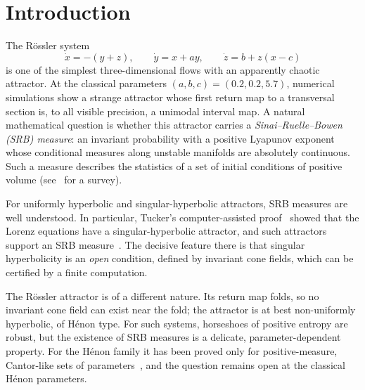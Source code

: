 \documentclass[11pt]{amsart}
\theoremstyle{definition}
\theoremstyle{remark}
\begin{document}
\maketitle

\section{Introduction}

The R\"ossler system~\cite{Rossler76}
\begin{equation}\label{eq:rossler}
\dot x=-(y+z),\qquad \dot y=x+ay,\qquad \dot z=b+z(x-c)
\end{equation}
is one of the simplest three-dimensional flows with an apparently chaotic attractor. At the classical
parameters $(a,b,c)=(0.2,0.2,5.7)$, numerical simulations show a strange attractor whose first return
map to a transversal section is, to all visible precision, a unimodal interval map. A natural
mathematical question is whether this attractor carries a \emph{Sinai--Ruelle--Bowen (SRB) measure}: an
invariant probability with a positive Lyapunov exponent whose conditional measures along unstable
manifolds are absolutely continuous. Such a measure describes the statistics of a set of initial
conditions of positive volume (see~\cite{Young02} for a survey).

For uniformly hyperbolic and singular-hyperbolic attractors, SRB measures are well understood. In
particular, Tucker's computer-assisted proof~\cite{Tucker02} showed that the Lorenz equations have a
singular-hyperbolic attractor, and such attractors support an SRB measure~\cite{APPV09}. The decisive
feature there is that singular hyperbolicity is an \emph{open} condition, defined by invariant cone
fields, which can be certified by a finite computation.

The R\"ossler attractor is of a different nature. Its return map folds, so no invariant cone field can
exist near the fold; the attractor is at best non-uniformly hyperbolic, of H\'enon type. For such
systems, horseshoes of positive entropy are robust, but the existence of SRB measures is a delicate,
parameter-dependent property. For the H\'enon family it has been proved only for positive-measure,
Cantor-like sets of parameters~\cite{BC91,BY93,MV93,BV01}, and the question remains open at the
classical H\'enon parameters.
\end{document}

